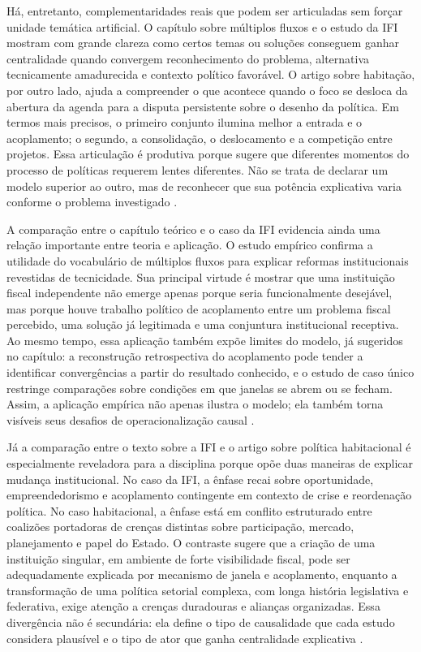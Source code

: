 \documentclass[12pt,a4paper]{article}
\begin{document}
Há, entretanto, complementaridades reais que podem ser articuladas sem forçar unidade temática artificial. O capítulo sobre múltiplos fluxos e o estudo da IFI mostram com grande clareza como certos temas ou soluções conseguem ganhar centralidade quando convergem reconhecimento do problema, alternativa tecnicamente amadurecida e contexto político favorável. O artigo sobre habitação, por outro lado, ajuda a compreender o que acontece quando o foco se desloca da abertura da agenda para a disputa persistente sobre o desenho da política. Em termos mais precisos, o primeiro conjunto ilumina melhor a entrada e o acoplamento; o segundo, a consolidação, o deslocamento e a competição entre projetos. Essa articulação é produtiva porque sugere que diferentes momentos do processo de políticas requerem lentes diferentes. Não se trata de declarar um modelo superior ao outro, mas de reconhecer que sua potência explicativa varia conforme o problema investigado \parencite{brasil2022_abordagens_contemporaneas,anonsd_sem_titulo,ferreira2019_politica_habitacional}.

A comparação entre o capítulo teórico e o caso da IFI evidencia ainda uma relação importante entre teoria e aplicação. O estudo empírico confirma a utilidade do vocabulário de múltiplos fluxos para explicar reformas institucionais revestidas de tecnicidade. Sua principal virtude é mostrar que uma instituição fiscal independente não emerge apenas porque seria funcionalmente desejável, mas porque houve trabalho político de acoplamento entre um problema fiscal percebido, uma solução já legitimada e uma conjuntura institucional receptiva. Ao mesmo tempo, essa aplicação também expõe limites do modelo, já sugeridos no capítulo: a reconstrução retrospectiva do acoplamento pode tender a identificar convergências a partir do resultado conhecido, e o estudo de caso único restringe comparações sobre condições em que janelas se abrem ou se fecham. Assim, a aplicação empírica não apenas ilustra o modelo; ela também torna visíveis seus desafios de operacionalização causal \parencite{anonsd_sem_titulo,brasil2022_abordagens_contemporaneas}.

Já a comparação entre o texto sobre a IFI e o artigo sobre política habitacional é especialmente reveladora para a disciplina porque opõe duas maneiras de explicar mudança institucional. No caso da IFI, a ênfase recai sobre oportunidade, empreendedorismo e acoplamento contingente em contexto de crise e reordenação política. No caso habitacional, a ênfase está em conflito estruturado entre coalizões portadoras de crenças distintas sobre participação, mercado, planejamento e papel do Estado. O contraste sugere que a criação de uma instituição singular, em ambiente de forte visibilidade fiscal, pode ser adequadamente explicada por mecanismo de janela e acoplamento, enquanto a transformação de uma política setorial complexa, com longa história legislativa e federativa, exige atenção a crenças duradouras e alianças organizadas. Essa divergência não é secundária: ela define o tipo de causalidade que cada estudo considera plausível e o tipo de ator que ganha centralidade explicativa \parencite{anonsd_sem_titulo,ferreira2019_politica_habitacional}.
\end{document}
